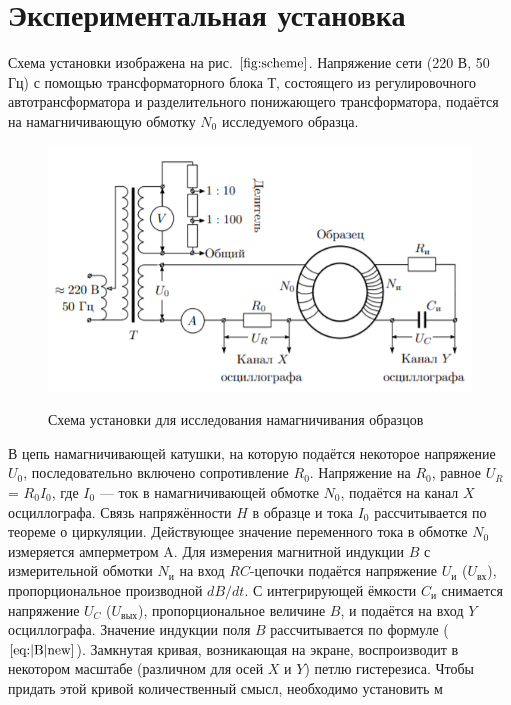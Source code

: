 \documentclass[12pt,a4paper]{article}
\begin{document}
\section*{Экспериментальная установка}

Схема установки изображена на рис. $\ref{fig:scheme}$. Напряжение сети (220 В,
50 Гц) с помощью трансформаторного блока Т, состоящего из регулировочного автотрансформатора и разделительного понижающего трансформатора, подаётся на намагничивающую обмотку $N_0$ исследуемого образца.

\begin{figure}[h]
	\centering
	\caption{ Схема установки для исследования намагничивания образцов}
	\includegraphics{res/scheme.png}
	\label{fig:scheme}
\end{figure}

В цепь намагничивающей катушки, на которую подаётся некоторое
напряжение $U_0$, последовательно включено сопротивление $R_0$. Напряжение на $R_0$, равное $U_R$= $R_0I_0$, где $I_0$ — ток в намагничивающей обмотке $N_0$, подаётся на канал $ X $ осциллографа. Связь напряжённости $ H $ в
образце и тока $I_0$ рассчитывается по теореме о циркуляции. 
Действующее значение переменного тока в обмотке $N_0$ измеряется амперметром A.
Для измерения магнитной индукции $ B $ с измерительной обмотки $N_\text{и}$
на вход $ RC $-цепочки подаётся напряжение $U_\text{и}$ ($U_{\text{вх}}$), пропорциональное
производной $ dB/dt $. С интегрирующей ёмкости $C_\text{и}$ снимается напряжение $U_C$ ($U_{\text{вых}}$), пропорциональное величине $ B $, и подаётся на вход $ Y $
осциллографа. Значение индукции поля $ B $ рассчитывается по формуле ($\ref{eq:|B|new}$).
Замкнутая кривая, возникающая на экране, воспроизводит в некотором масштабе (различном для осей $ X $ и $ Y $) петлю гистерезиса. Чтобы придать этой кривой количественный смысл, необходимо установить
м
\end{document}
